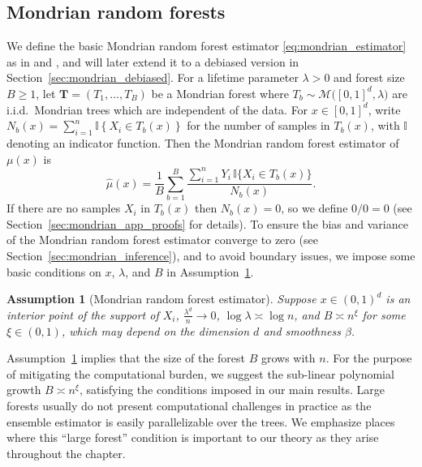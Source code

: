 \documentclass[11pt,lof]{puthesis}
\newcommand{\I}{\ensuremath{\mathbb{I}}}
\newcommand{\bT}{\ensuremath{\mathbf{T}}}
\newcommand{\cM}{\ensuremath{\mathcal{M}}}
\theoremstyle{break}
\newtheorem{assumption}{Assumption}[section]
\theoremstyle{proof}
\begin{document}
\subsection{Mondrian random forests}
\label{sec:mondrian_forests}

We define the basic Mondrian random forest estimator
\eqref{eq:mondrian_estimator} as in \citet{lakshminarayanan2014mondrian} and
\citet{mourtada2020minimax}, and will later extend it to a debiased version in
Section~\ref{sec:mondrian_debiased}. For a lifetime parameter $\lambda > 0$ and
forest
size $B \geq 1$, let $\bT = (T_1, \ldots, T_B)$ be a Mondrian forest where
$T_b \sim \cM\big([0,1]^d, \lambda\big)$ are i.i.d.\ Mondrian trees
which are independent of the data. For $x \in [0,1]^d$, write
$N_b(x) = \sum_{i=1}^{n} \I \left\{ X_i \in T_b(x) \right\}$ for the number of
samples in $T_b(x)$, with $\I$ denoting an indicator function. Then the
Mondrian random forest estimator of $\mu(x)$ is
%
\begin{equation}
  \label{eq:mondrian_estimator}
  \hat\mu(x) = \frac{1}{B} \sum_{b=1}^B
  \frac{\sum_{i=1}^n Y_i \, \I\big\{ X_i \in T_b(x) \big\}} {N_b(x)}.
\end{equation}
%
If there are no samples $X_i$ in $T_b(x)$ then $N_b(x) = 0$, so we define
$0/0 = 0$ (see Section~\ref{sec:mondrian_app_proofs} for details). To ensure the
bias and variance of the Mondrian random forest estimator converge to zero (see
Section~\ref{sec:mondrian_inference}), and to avoid boundary issues, we impose
some basic conditions on $x$, $\lambda$, and $B$ in
Assumption~\ref{ass:mondrian_estimator}.

\begin{assumption}[Mondrian random forest estimator]%
  \label{ass:mondrian_estimator}
  Suppose $x \in (0,1)^d$ is an interior point of the support of $X_i$,
  $\frac{\lambda^d}{n} \to 0$,
  $\log \lambda \asymp \log n$,
  and $B \asymp n^{\xi}$ for some $\xi \in (0, 1)$,
  which may depend on the dimension $d$ and smoothness $\beta$.
\end{assumption}

Assumption~\ref{ass:mondrian_estimator} implies that the size of the forest $B$
grows
with $n$. For the purpose of mitigating the computational burden, we suggest
the sub-linear polynomial growth $B \asymp n^{\xi}$, satisfying the conditions
imposed in our main results. Large forests usually do not present computational
challenges in practice as the ensemble estimator is easily parallelizable over
the trees. We emphasize places where this ``large forest'' condition is
important to our theory as they arise throughout the chapter.
\end{document}
